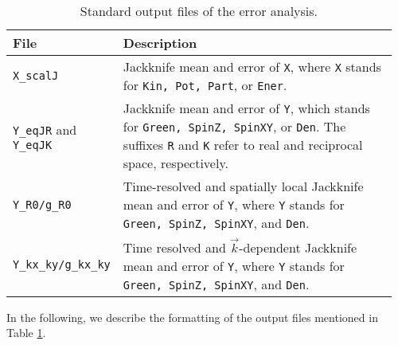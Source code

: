 \begin{table}[h]
	\begin{center}
	\begin{tabular}{@{} p{0.18\linewidth} p{0.78\linewidth} @{}}\toprule
		File & Description \\\midrule
		\texttt{X\_scalJ} & Jackknife mean and error of \texttt{X}, where  \texttt{X} stands for \texttt{Kin, Pot, Part}, or \texttt{Ener}.\\
		\texttt{Y\_eqJR} and \texttt{Y\_eqJK} & Jackknife mean and error of \texttt{Y}, which stands for \texttt{Green, SpinZ, SpinXY}, or \texttt{Den}. The suffixes \texttt{R} and \texttt{K} refer to real and reciprocal space, respectively.\\
		\texttt{Y\_R0/g\_R0} & Time-resolved and spatially local Jackknife mean and error of \texttt{Y}, where \texttt{Y} stands for \texttt{Green, SpinZ, SpinXY}, and \texttt{Den}.\\
		\texttt{Y\_kx\_ky/g\_kx\_ky} & Time resolved and $\vec{k}$-dependent Jackknife mean and error of \texttt{Y}, where \texttt{Y} stands for \texttt{Green, SpinZ, SpinXY}, and \texttt{Den}.\\\bottomrule
	\end{tabular}
	\caption{ Standard output files of the error analysis. \label{table:analysis_output}}
\end{center}
\end{table}
%
In the following, we describe the formatting of the output files mentioned in Table \ref{table:analysis_output}.
